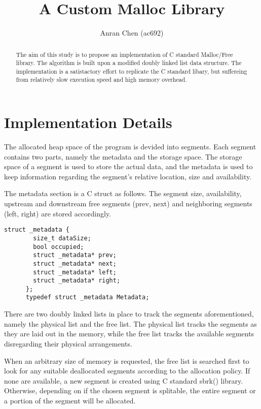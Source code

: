 \documentclass[12pt, letterpaper]{article}
\title{A Custom Malloc Library}
\author{Anran Chen (ac692)}
\date{}
\begin{document}
  \maketitle
  \begin{abstract}
    The aim of this study is to propose an implementation of C standard Malloc/Free library. 
    The algorithm is built upon a modified doubly linked list data structure. 
    The implementation is a satistactory effort to replicate the C standard libary, 
    but suffereing from relatively slow execution speed and high memory overhead. 
  \end{abstract}
  
  \section*{Implementation Details}
    The allocated heap space of the program is devided into segments. 
    Each segment contains two parts, namely the metadata and the storage space. 
    The storage space of a segment is used to store the actual data, 
    and the metadata is used to keep information regarding the segment's relative location, size and availability.

    The metadata section is a C struct as follows. 
    The segment size, availability, upstream and downstream free segments (prev, next)
    and neighboring segments (left, right) are stored accordingly. 

    \begin{lstlisting}[frame=single]
      struct _metadata {
        size_t dataSize;
        bool occupied;
        struct _metadata* prev;
        struct _metadata* next;
        struct _metadata* left;
        struct _metadata* right;
      };
      typedef struct _metadata Metadata;

    \end{lstlisting}

    There are two doubly linked lists in place to track the segments aforementioned, 
    namely the physical list and the free list.
    The physical list tracks the segments as they are laid out in the memory,
    while the free list tracks the available segments disregarding their physical arrangements. 

    When an arbitrary size of memory is requested, 
    the free list is searched first to look for any suitable deallocated segments according to the allocation policy.
    If none are available, a new segment is created using C standard sbrk() library. 
    Otherwise, depending on if the chosen segment is splitable, 
    the entire segment or a portion of the segment will be allocated.
\end{document}
